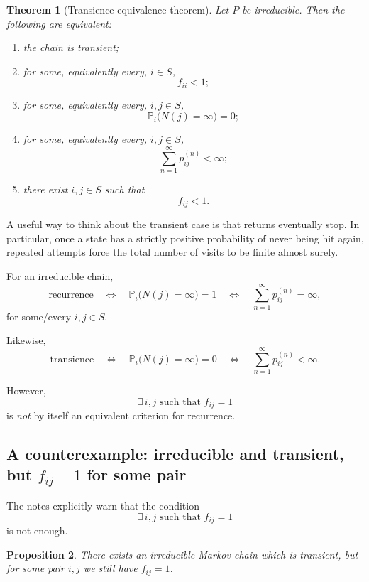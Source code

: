 \documentclass[11pt]{article}
\newtheorem{theorem}{Theorem}[section]
\newtheorem{proposition}[theorem]{Proposition}
\theoremstyle{definition}
\begin{document}
\begin{theorem}[Transience equivalence theorem]
Let \(P\) be irreducible. Then the following are equivalent:
\begin{enumerate}[label=\arabic*.]
    \item the chain is transient;
    \item for some, equivalently every, \(i\in S\),
    \[
    f_{ii}<1;
    \]
    \item for some, equivalently every, \(i,j\in S\),
    \[
    \mathbb P_i\bigl(N(j)=\infty\bigr)=0;
    \]
    \item for some, equivalently every, \(i,j\in S\),
    \[
    \sum_{n=1}^{\infty} p_{ij}^{(n)}<\infty;
    \]
    \item there exist \(i,j\in S\) such that
    \[
    f_{ij}<1.
    \]
\end{enumerate}
\end{theorem}

A useful way to think about the transient case is that returns eventually stop. In particular, once a state has a strictly positive probability of never being hit again, repeated attempts force the total number of visits to be finite almost surely.

\begin{keyformula}
For an irreducible chain,
\[
\text{recurrence}
\quad\Longleftrightarrow\quad
\mathbb P_i\bigl(N(j)=\infty\bigr)=1
\quad\Longleftrightarrow\quad
\sum_{n=1}^{\infty} p_{ij}^{(n)}=\infty,
\]
for some/every \(i,j\in S\).

Likewise,
\[
\text{transience}
\quad\Longleftrightarrow\quad
\mathbb P_i\bigl(N(j)=\infty\bigr)=0
\quad\Longleftrightarrow\quad
\sum_{n=1}^{\infty} p_{ij}^{(n)}<\infty.
\]

However,
\[
\exists\, i,j \text{ such that } f_{ij}=1
\]
is \emph{not} by itself an equivalent criterion for recurrence.
\end{keyformula}

\subsection{A counterexample: irreducible and transient, but \texorpdfstring{$f_{ij}=1$}{fij = 1} for some pair}

The notes explicitly warn that the condition
\[
\exists\, i,j \text{ such that } f_{ij}=1
\]
is not enough.

\begin{proposition}
There exists an irreducible Markov chain which is transient, but for some pair \(i,j\) we still have \(f_{ij}=1\).
\end{proposition}
\end{document}
